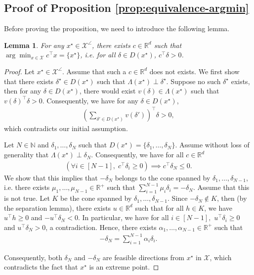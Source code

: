 \documentclass[11pt]{article}
\theoremstyle{plain}
\newtheorem{lemma}{Lemma}
\theoremstyle{definition}
\newcommand{\R}[0]{\mathbb R}
\newcommand{\cX}{\mathcal{X}}
\renewcommand{\Re}{\mathbb{R}}
\begin{document}
\subsection{Proof of Proposition \ref{prop:equivalence-argmin}}\label{prop:equivalence-argmin proof}
Before proving the proposition, we need to introduce the following lemma.
\begin{lemma}\label{existence of unique argmin}
    For any $x^\star\in \cX^\angle$, there exists $c\in \R^d$ such that $\arg\min_{x\in \cX}c^\top x=\{x^\star\}$, i.e. for all $\delta \in D(x^\star)$, $c^\top \delta >0$.
\end{lemma}
\begin{proof}
    Let $x^\star \in \cX^\angle$. Assume that such a $c\in \R^d$ does not exists. We first show that there exists $\delta^\star \in D(x^\star)$ such that $\Lambda(x^\star)\perp \delta^\star$. Suppose no such $\delta^\star$ exists, then for any $\delta \in D(x^\star)$, there would exist $v(\delta)\in \Lambda(x^\star)$ such that $v(\delta)^\top \delta >0$. Consequently, we have for any $\delta \in D(x^\star)$,
    \begin{align*}
        \left(\sum_{\delta'\in D(x^\star)}^{}v(\delta')\right)^\top \delta >0,
    \end{align*}
    which contradicts our initial assumption. 
    
    Let $N\in \mathbb N$ and $\delta_1,\dots,\delta_N$ such that $D(x^\star)=\{\delta_1,\dots,\delta_N\}$. Assume without loss of generality that $ \Lambda (x^\star)\perp \delta_N$. Consequently, we have for all $c \in \Re^d$
    \begin{align*}
        \left(\forall i \in [N-1],\; c^\top \delta_i\geq 0\right)\implies c^\top \delta_N\leq 0.
    \end{align*}
    We show that this implies that $-\delta_N$ belongs to the cone spanned by $\delta_1,\dots,\delta_{N-1}$, i.e. there exists $\mu_1,\dots,\mu_{N-1}\in \R^+$ such that $\sum_{i=1}^{N-1}\mu_i\delta_i=-\delta_N$. Assume that this is not true. Let $K$ be the cone spanned by $\delta_1,\dots,\delta_{N-1}$. Since $-\delta_N\not\in K$, then (by the separation lemma), there exists $u\in \R^d$ such that for all $h\in K$, we have $u^\top h\geq 0$ and $-u^\top \delta_N <0$. In particular, we have for all $i\in [N-1],$ $u^\top \delta_i\geq 0$ and $u^\top \delta_N>0$, a contradiction. Hence, there exists $\alpha_1,\dots,\alpha_{N-1}\in \R^+$ such that 
    \begin{align*}
        -\delta_N=\sum_{i=1}^{N-1}\alpha_i \delta_i.
    \end{align*}

    Consequently, both $\delta_N$ and $-\delta_N$ are feasible directions from $x^\star$ in $\cX$, which contradicts the fact that $x^\star$ is an extreme point.
\end{proof}
\end{document}

